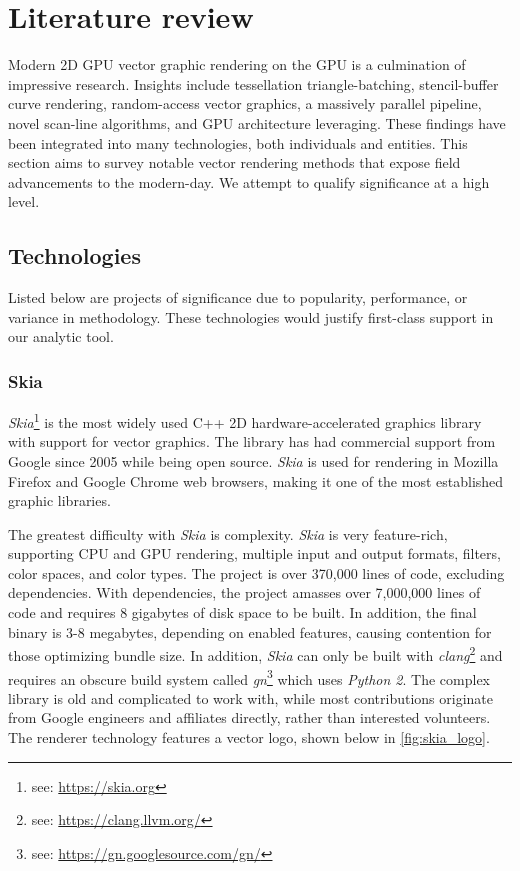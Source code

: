 \chapter{Literature review}\label{sec:literature_review}

Modern 2D GPU vector graphic rendering on the GPU is a culmination of impressive research. Insights include tessellation triangle-batching\cite{Silva18}, stencil-buffer curve rendering\cite{Loop05}, random-access vector graphics\cite{Nehab08}, a massively parallel pipeline\cite{Ganacim14}, novel scan-line algorithms\cite{Li16}, and GPU architecture leveraging\cite{Levien20}. These findings have been integrated into many technologies, both individuals and entities. This section aims to survey notable vector rendering methods that expose field advancements to the modern-day. We attempt to qualify significance at a high level.

\section{Technologies}

Listed below are projects of significance due to popularity, performance, or variance in methodology. These technologies would justify first-class support in our analytic tool.

\subsection{Skia}\label{sec:skia}
\textit{Skia}\footnote{see: \href{https://skia.org}{https://skia.org}} is the most widely used C++ 2D hardware-accelerated graphics library with support for vector graphics. The library has had commercial support from Google since 2005 while being open source\cite{Skia}. \textit{Skia} is used for rendering in Mozilla Firefox and Google Chrome web browsers, making it one of the most established graphic libraries.

The greatest difficulty with \textit{Skia} is complexity. \textit{Skia} is very feature-rich, supporting CPU and GPU rendering, multiple input and output formats, filters, color spaces, and color types. The project is over 370,000 lines of code, excluding dependencies. With dependencies, the project amasses over 7,000,000 lines of code and requires 8 gigabytes of disk space to be built. In addition, the final binary is 3-8 megabytes, depending on enabled features, causing contention for those optimizing bundle size. In addition, \textit{Skia} can only be built with \textit{clang}\footnote{see: \href{https://clang.llvm.org/}{https://clang.llvm.org/}} and requires an obscure build system called \textit{gn}\footnote{see: \href{https://gn.googlesource.com/gn/}{https://gn.googlesource.com/gn/}} which uses \textit{Python 2}. The complex library is old and complicated to work with, while most contributions originate from Google engineers and affiliates directly, rather than interested volunteers. The renderer technology features a vector logo, shown below in \cref{fig:skia_logo}.\medskip

